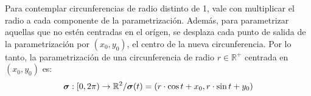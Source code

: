 \begin{definition}[Parametrización]
\begin{example}
        Para contemplar circunferencias de radio distinto de 1, vale con multiplicar el radio a cada componente de la parametrización.
        Además, para parametrizar aquellas que no estén centradas en el orígen, se desplaza cada punto de salida de la
        parametrización por $(x_0,y_0)$, el centro de la nueva circunferencia.
        Por lo tanto, la parametrización de una circunferencia de radio $r\in\mathbb{R}^+$ centrada en $(x_0,y_0)$ es:
        \begin{equation*}
            \boldsymbol{\sigma}:[0,2\pi)\rightarrow\mathbb{R}^2/ \\ \boldsymbol{\sigma}(t)=(r\cdot\cos{t}+x_0,r\cdot\sin{t}+y_0)
        \end{equation*} 
    \end{example}
\end{definition}